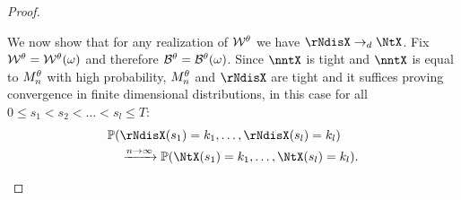 \begin{proof}
\begin{proofpart}
We now show that for any realization of $\mathcal{W}^{\theta}$ we have $\rNdisX \rightarrow_d \NtX$.
Fix $\mathcal{W}^{\theta} = \mathcal{W}^{\theta}(\omega)$ and therefore $\mathcal{B}^{\theta} = \mathcal{B}^{\theta}(\omega)$.
Since $\nntX$ is tight and $\nntX$ is equal to $M_n^{\theta}$ with high probability,
$M_n^{\theta}$ and $\rNdisX$ are tight and it suffices proving convergence in finite dimensional distributions,
in this case for all $0 \leq s_1 < s_2 < \dots < s_l \leq T$:
\begin{equation} \label{E: convergence fdd}
\begin{aligned}
&\Prob( \rNdisX(s_1) = k_1, \dots, \rNdisX(s_l) = k_l ) \\
&\quad \xrightarrow{n \rightarrow \infty}  \Prob( \NtX(s_1) = k_1, \dots, \NtX(s_l) = k_l ).
\end{aligned}
\end{equation}


\end{proofpart}
\end{proof}
